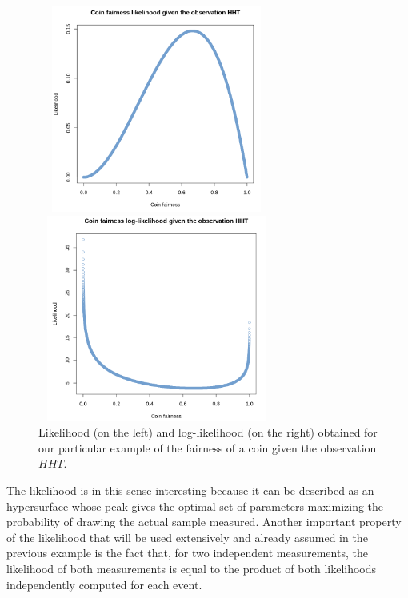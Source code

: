 \documentclass[a4paper, 11pt]{report}
\begin{document}
\begin{figure}[htbp]
\centering
\begin{minipage}[b]{.49\textwidth}
\includegraphics[width=7.8cm, height=6.8cm]{figs/likelihood.png}
\end{minipage}\hfill
\begin{minipage}[b]{.49\textwidth}
\includegraphics[width=7.8cm, height=6.8cm]{figs/loglikelihood.png}
\end{minipage} \hfill
\caption{Likelihood (on the left) and log-likelihood (on the right) obtained for our particular example of the fairness of a coin given the observation $HHT$.}
\label{fig:likelihoodEx}
\end{figure}

The likelihood is in this sense interesting because it can be described as an hypersurface whose peak gives the optimal set of parameters maximizing the probability of drawing the actual sample measured. Another important property of the likelihood that will be used extensively and already assumed in the previous example is the fact that, for two independent measurements, the likelihood of both measurements is equal to the product of both likelihoods independently computed for each event.
\end{document}
